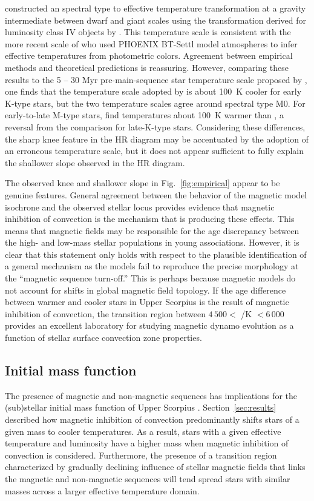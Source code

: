 \documentclass{aa}
\begin{document}
\citet{Preibisch1999} constructed an spectral type to effective temperature transformation at a gravity intermediate between dwarf and giant scales using the transformation derived for luminosity class IV objects by \citet{deJager1987}. This temperature scale is consistent with the more recent scale of \citet{Herczeg2015} who used PHOENIX BT-Settl model atmospheres \citep{Allard2011} to infer effective temperatures from photometric colors. Agreement between empirical methods and theoretical predictions is reassuring. However, comparing these results to the 5 -- 30 Myr pre-main-sequence star temperature scale proposed by \citet{Pecaut2013}, one finds that the temperature scale adopted by \citeauthor{Preibisch1999} is about 100~K cooler for early K-type stars, but the two temperature scales agree around spectral type M0. For early-to-late M-type stars, \citeauthor{Preibisch1999} find temperatures about 100~K warmer than \citet{Pecaut2013}, a reversal from the comparison for late-K-type stars. Considering these differences, the sharp knee feature in the HR diagram may be accentuated by the adoption of an erroneous temperature scale, but it does not appear sufficient to fully explain the shallower slope observed in the HR diagram.

The observed knee and shallower slope in Fig.~\ref{fig:empirical} appear to be genuine features. General agreement between the behavior of the magnetic model isochrone and the observed stellar locus provides evidence that magnetic inhibition of convection is the mechanism that is producing these effects. This means that magnetic fields may be responsible for the age discrepancy between the high- and low-mass stellar populations in young associations. However, it is clear that this statement only holds with respect to the plausible identification of a general mechanism as the models fail to reproduce the precise morphology at the ``magnetic sequence turn-off.'' This is perhaps because magnetic models do not account for shifts in global magnetic field topology. If the age difference between warmer and cooler stars in Upper Scorpius is the result of magnetic inhibition of convection, the transition region between $4\,500 <$ \teff/K $< 6\,000$ provides an excellent laboratory for studying magnetic dynamo evolution as a function of stellar surface convection zone properties.

\subsection{Initial mass function}
The presence of magnetic and non-magnetic sequences has implications for the (sub)stellar initial mass function of Upper Scorpius \citep{Ardila2000, Preibisch2002}. Section~\ref{sec:results} described how magnetic inhibition of convection predominantly shifts stars of a given mass to cooler temperatures. As a result, stars with a given effective temperature and luminosity have a higher mass when magnetic inhibition of convection is considered. Furthermore, the presence of a transition region characterized by gradually declining influence of stellar magnetic fields that links the magnetic and non-magnetic sequences will tend spread stars with similar masses across a larger effective temperature domain. 
\end{document}
